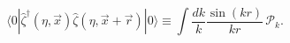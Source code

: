 \begin{equation}\label{eq:power-def}
  \langle 0|\hat{\zeta}^\dag(\eta,\vec{x})
  \hat{\zeta}(\eta,\vec{x}+\vec{r})|0\rangle
  \equiv \int  \frac{dk}{k}   \frac{\sin(kr)}{kr} \,\mathcal{P}_k.
\end{equation}

